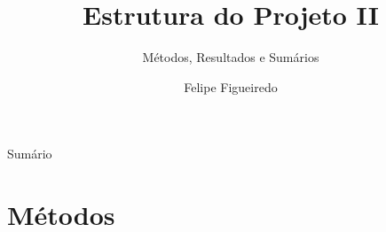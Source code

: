 \documentclass{beamer}
\title%
{Estrutura do Projeto II}
\subtitle
{Métodos, Resultados e Sumários} %
\author%
{Felipe Figueiredo}%
\institute[INTO] %
{Instituto Nacional de Traumatologia e Ortopedia
}
\date%
{}
\begin{document}
\begin{frame}
  \titlepage
\end{frame}

\begin{frame}{Sumário}
  \tableofcontents
\end{frame}








\section{Métodos}
\end{document}
